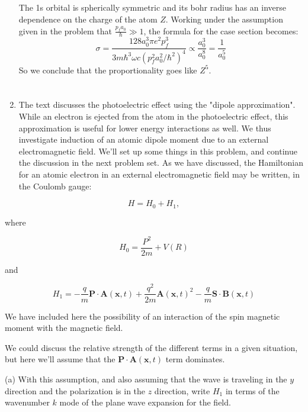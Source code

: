 \documentclass[12pt]{article}
\begin{document}
\begin{enumerate}
\subsection{}
The 1s orbital is spherically symmetric and its bohr radius has an inverse dependence on the charge of the atom $Z$. Working under the assumption given in the problem that $\frac{p_fa_0}{\hbar} \gg 1$, the formula for the case section becomes:
\begin{equation}
  \sigma = \frac{128 a_0^3 \pi e^2 p_f^3}{3 m \hbar^3 \omega c(p_f^2 a_0^2 / \hbar^2)^4} \propto \frac{a_0^3}{a_0^8} = \frac{1}{a_0^5}
\end{equation}
So we conclude that the proportionality goes like $Z^5$.
\section{}
  \item The text discusses the photoelectric effect using the "dipole approximation". While an electron is ejected from the atom in the photoelectric effect, this approximation is useful for lower energy interactions as well. We thus investigate induction of an atomic dipole moment due to an external electromagnetic field. We'll set up some things in this problem, and continue the discussion in the next problem set. As we have discussed, the Hamiltonian for an atomic electron in an external electromagnetic field may be written, in the Coulomb gauge:

\end{enumerate}
$$
H=H_{0}+H_{1},
$$

where

$$
H_{0}=\frac{P^{2}}{2 m}+V(R)
$$

and

$$
H_{1}=-\frac{q}{m} \mathbf{P} \cdot \mathbf{A}(\mathbf{x}, t)+\frac{q^{2}}{2 m} \mathbf{A}(\mathbf{x}, t)^{2}-\frac{q}{m} \mathbf{S} \cdot \mathbf{B}(\mathbf{x}, t)
$$

We have included here the possibility of an interaction of the spin magnetic moment with the magnetic field.

We could discuss the relative strength of the different terms in a given situation, but here we'll assume that the $\mathbf{P} \cdot \mathbf{A}(\mathbf{x}, t)$ term dominates.

(a) With this assumption, and also assuming that the wave is traveling in the $y$ direction and the polarization is in the $z$ direction, write $H_{1}$ in terms of the wavenumber $k$ mode of the plane wave expansion for the field.
\end{document}
